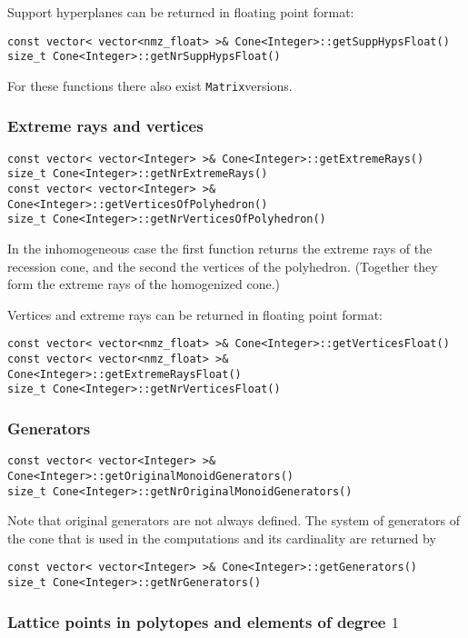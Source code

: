 \documentclass[12pt,a4paper]{scrartcl}
\theoremstyle{definition}
\def\ttt{\texttt}
\begin{document}
\begin{small}
Support hyperplanes can be returned in floating point format:
\begin{Verbatim}
const vector< vector<nmz_float> >& Cone<Integer>::getSuppHypsFloat()
size_t Cone<Integer>::getNrSuppHypsFloat()
\end{Verbatim}

For these functions there also exist \ttt{Matrix}versions.

\subsubsection{Extreme rays and vertices}

\begin{Verbatim}
const vector< vector<Integer> >& Cone<Integer>::getExtremeRays()
size_t Cone<Integer>::getNrExtremeRays()
const vector< vector<Integer> >& Cone<Integer>::getVerticesOfPolyhedron()
size_t Cone<Integer>::getNrVerticesOfPolyhedron()
\end{Verbatim}

In the inhomogeneous case the first function returns the extreme rays of the recession cone, and the second the vertices of the polyhedron. (Together they form the extreme rays of the homogenized cone.)

Vertices and extreme rays can be returned in floating point format:
\begin{Verbatim}
const vector< vector<nmz_float> >& Cone<Integer>::getVerticesFloat()
const vector< vector<nmz_float> >& Cone<Integer>::getExtremeRaysFloat()
size_t Cone<Integer>::getNrVerticesFloat()
\end{Verbatim}

\subsubsection{Generators}

\begin{Verbatim}
const vector< vector<Integer> >& Cone<Integer>::getOriginalMonoidGenerators()
size_t Cone<Integer>::getNrOriginalMonoidGenerators()
\end{Verbatim}
Note that original generators are not always defined. The system of generators of the cone that is used in the computations and its cardinality are returned by
\begin{Verbatim}
const vector< vector<Integer> >& Cone<Integer>::getGenerators()
size_t Cone<Integer>::getNrGenerators()
\end{Verbatim}

\subsubsection{Lattice points in polytopes and elements of degree $1$}


\end{small}
\end{document}
